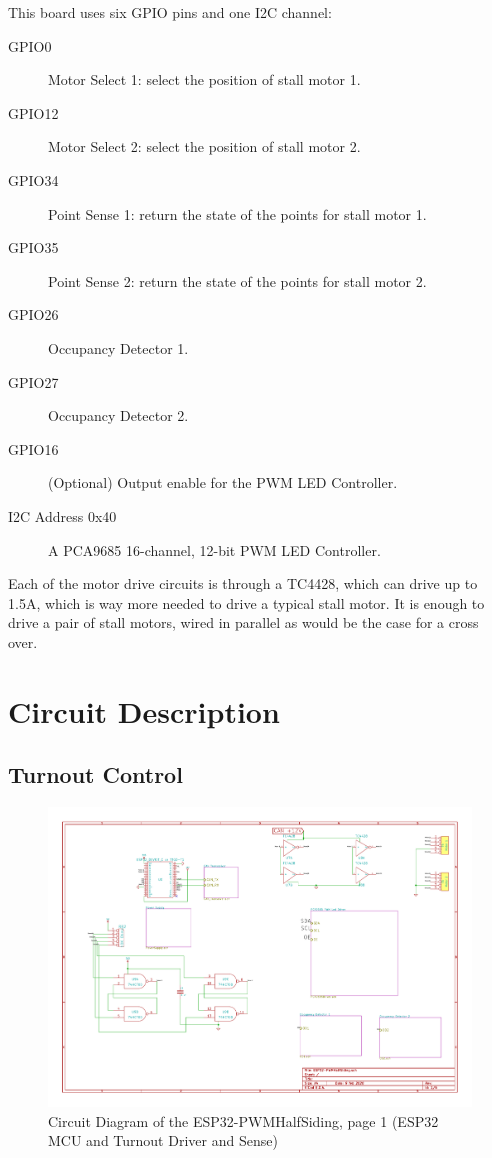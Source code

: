 This board uses six GPIO pins and one I2C channel:

\begin{description}
\item[GPIO0] Motor Select 1: select the position of stall motor 1.
\item[GPIO12] Motor Select 2: select the position of stall motor 2.
\item[GPIO34] Point Sense 1: return the state of the points for 
stall motor 1. 
\item[GPIO35] Point Sense 2: return the state of the points for 
stall motor 2. 
\item[GPIO26] Occupancy Detector 1.
\item[GPIO27] Occupancy Detector 2.
\item[GPIO16] (Optional) Output enable for the PWM LED Controller.
\item[I2C Address 0x40] A PCA9685 16-channel, 12-bit PWM LED Controller.
\end{description}

Each of the motor drive circuits is through a TC4428, which can drive up to
1.5A, which is way more needed to drive a typical stall motor. It is enough to
drive a pair of stall motors, wired in parallel as would be the case for a
cross over. 

\section{Circuit Description}


\subsection{Turnout Control}
\begin{figure}[hbpt]\begin{centering}%
\includegraphics[width=5in]{ESP32-PWMHalfSiding-1.pdf}
\caption{Circuit Diagram of the ESP32-PWMHalfSiding, page 1 (ESP32 MCU and 
Turnout Driver and Sense)}
\end{centering}\end{figure}

